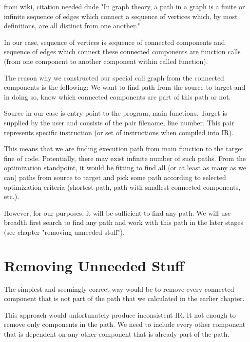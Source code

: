 \documentclass[12pt, twoside]{fithesis2}
\renewcommand{\_}{\leavevmode \kern0.07em\vbox{\hrule width0.4em}}
\begin{document}

from wiki, citation needed dude "In graph theory, a path in a graph is a finite
or infinite sequence of edges which connect a sequence of vertices which, by
most definitions, are all distinct from one another."

In our case, sequence of vertices is sequence of connected components and
sequence of edges which connect these connected components are function calls
(from one component to another component within called function).

The reason why we constructed our special call graph from the connected
components is the following: We want to find path from the source to target and
in doing so, know which connected components are part of this path or not.

Source in our case is entry point to the program, main functions. Target is
supplied by the user and consists of the pair filename, line number. This pair
represents specific instruction (or set of instructions when compiled into IR).

This means that we are finding execution path from main function to the target
fine of code. Potentially, there may exist infinite number of such paths. From
the optimization standpoint, it would be fitting to find all (or at least as
many as we can) paths from source to target and pick some path according to
selected optimization criteria (shortest path, path with smallest connected
components, etc.).

However, for our purposes, it will be sufficient to find any path. We will use
breadth first search to find any path and work with this path in the later
stages (see chapter "removing unneeded stuff").


\section{Removing Unneeded Stuff}
\label{sec:design-removing}


The simplest and seemingly correct way would be to remove every connected
component that is not part of the path that we calculated in the earlier
chapter.

This approach would unfortunately produce inconsistent IR. It not enough to
remove only components in the path. We need to include every other component
that is dependent on any other component that is already part of the path.
\end{document}
